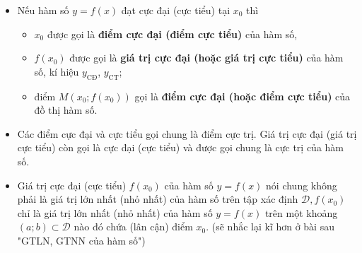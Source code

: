 \begin{note}
\begin{itemize}
	\item Nếu hàm số $y=f(x)$ đạt cực đại (cực tiểu) tại $x_0$ thì
		\begin{itemize}
			\item $x_0$ được gọi là \textbf{điểm cực đại (điểm cực tiểu)} của hàm số,
			\item $f(x_0)$ được gọi là \textbf{giá trị cực đại (hoặc giá trị cực tiểu)} của hàm số, kí hiệu $y_{\text{CĐ}}$, $y_{\text{CT}}$;
			\item điểm $M(x_0;f(x_0))$ gọi là \textbf{điểm cực đại (hoặc điểm cực tiểu)} của đồ thị hàm số.
		\end{itemize}
	\item Các điểm cực đại và cực tiểu gọi chung là điểm cực trị. Giá trị cực đại (giá trị cực tiểu) còn gọi là cực đại (cực tiểu) và được gọi chung là cực trị của hàm số.
	\item Giá trị cực đại (cực tiểu) $f(x_0)$ của hàm số $y=f(x)$ nói chung không phải là giá trị lớn nhất (nhỏ nhất) của hàm số trên tập xác định $\mathscr{D}, f(x_0)$ chỉ là giá trị lớn nhất (nhỏ nhất) của hàm số $y=f(x)$ trên một khoảng $(a;b)\subset \mathscr{D}$ nào đó chứa (lân cận) điểm $x_0$. (sẽ nhắc lại kĩ hơn ở bài sau "GTLN, GTNN của hàm số")
\end{itemize}
\end{note}
